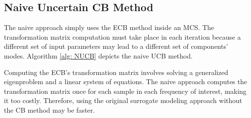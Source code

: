 %
%

\subsection{Naive Uncertain CB Method}
\label{ssec: NUCB}

The naive approach simply uses the ECB method inside an MCS.
The transformation matrix computation must take place in each iteration because a different set of input parameters may lead to a different set of components' modes.
Algorithm \ref{alg: NUCB} depicts the naive UCB method.



Computing the ECB's transformation matrix involves solving a generalized eigenproblem and a linear system of equations.
The naive approach computes the transformation matrix once for each sample in each frequency of interest, making it too costly.
Therefore, using the original surrogate modeling approach without the CB method may be faster.
